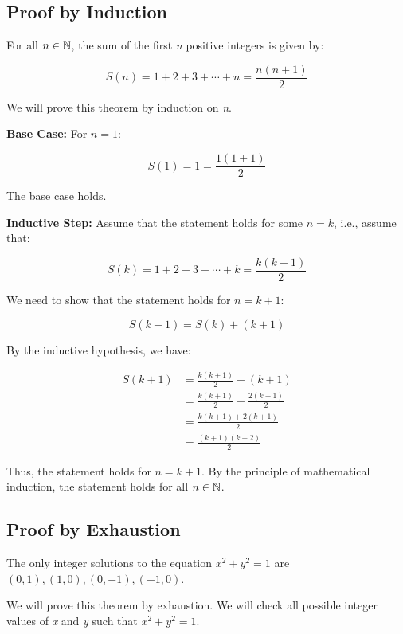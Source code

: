 \QED

\subsection{Proof by Induction}

For all \( n \in \mathbb{N} \), the sum of the first \emph{n} positive integers is given by:

\[
	S(n) = 1 + 2 + 3 + \cdots + n = \frac{n(n+1)}{2}
\]

We will prove this theorem by induction on \emph{n}.
\vspace{\baselineskip}

\textbf{Base Case:} For \( n = 1 \):

\[
	S(1) = 1 = \frac{1(1+1)}{2}
\]

The base case holds.
\vspace{\baselineskip}

\textbf{Inductive Step:} Assume that the statement holds for some \( n = k \), i.e., assume that:
	
\[
	S(k) = 1 + 2 + 3 + \cdots + k = \frac{k(k+1)}{2}
\]
	
We need to show that the statement holds for \( n = k + 1 \):

\[
	S(k+1) = S(k) + (k + 1)
\]
	
By the inductive hypothesis, we have:

\begin{align*}
	S(k+1) &= \frac{k(k+1)}{2} + (k + 1) \\
	&= \frac{k(k+1)}{2} + \frac{2(k + 1)}{2}\\
    &= \frac{k(k+1) + 2(k + 1)}{2} \\
	&= \frac{(k + 1)(k + 2)}{2}	
\end{align*}

Thus, the statement holds for \( n = k + 1 \).
By the principle of mathematical induction, the statement holds for all \( n \in \mathbb{N} \).

\QED

\subsection{Proof by Exhaustion}

The only integer solutions to the equation \( x^2 + y^2 = 1 \) are \( (0, 1), (1, 0), (0, -1), (-1, 0) \).
\vspace{\baselineskip}

We will prove this theorem by exhaustion. We will check all possible integer values of \emph{x} and 
\emph{y} such that \( x^2 + y^2 = 1 \).
\vspace{\baselineskip}

